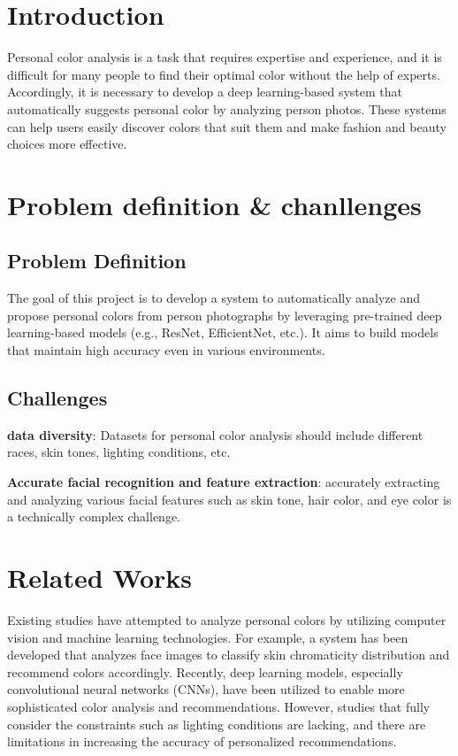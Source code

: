 \documentclass{article}
\begin{document}
\section{Introduction}

Personal color analysis is a task that requires expertise and experience, and it is difficult for many people to find their optimal color without the help of experts. Accordingly, it is necessary to develop a deep learning-based system that automatically suggests personal color by analyzing person photos. These systems can help users easily discover colors that suit them and make fashion and beauty choices more effective.  

\section{Problem definition \& chanllenges}
\subsection{Problem Definition}
The goal of this project is to develop a system to automatically analyze and propose personal colors from person photographs by leveraging pre-trained deep learning-based models (e.g., ResNet, EfficientNet, etc.). It aims to build models that maintain high accuracy even in various environments.

\subsection{Challenges}
\textbf{data diversity}: Datasets for personal color analysis should include different races, skin tones, lighting conditions, etc. 

\textbf{Accurate facial recognition and feature extraction}: accurately extracting and analyzing various facial features such as skin tone, hair color, and eye color is a technically complex challenge.  

\section{Related Works }
Existing studies have attempted to analyze personal colors by utilizing computer vision and machine learning technologies. For example, a system has been developed that analyzes face images to classify skin chromaticity distribution and recommend colors accordingly.  
Recently, deep learning models, especially convolutional neural networks (CNNs), have been utilized to enable more sophisticated color analysis and recommendations. However, studies that fully consider the constraints such as lighting conditions are lacking, and there are limitations in increasing the accuracy of personalized recommendations.
\end{document}
